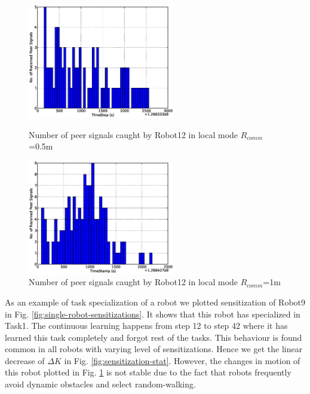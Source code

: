 \documentclass[letterpaper, 10 pt, conference]{ieeeconf}  %
\begin{document}
\begin{figure}
\begin{minipage}[t]{0.5\linewidth}
\centering
\includegraphics[height=5cm, angle=0]{images/local-500cm/Robot12-16feb-1-LocalSignals.eps}
\caption{\small Number of peer signals caught by Robot12 in local mode $R_{comm}$=0.5m}
\label{fig:single-robot-sensitizations} %
\end{minipage} 
\begin{minipage}[t]{0.5\linewidth}
\centering
\includegraphics[height=5cm, angle=0]{images/local-1m/Robot12-17feb-3-LocalSignals.eps}
\caption{\small  Number of peer signals caught by Robot12 in local mode $R_{comm}$=1m}
\label{fig:single-robot-translation} %
\end{minipage}
\end{figure}


As an example of task specialization of a robot we plotted sensitization of Robot9 in Fig. \ref{fig:single-robot-sensitizations}. It shows that this robot has specialized in Task1. The continuous learning happens from step 12 to step 42 where it has learned this task completely and forgot rest of the tasks. This behaviour is found common in all robots with varying level of sensitizations. Hence we get the linear decrease of $\Delta K$ in Fig. \ref{fig:sensitization-stat}. However, the changes in motion of this robot plotted in Fig. \ref{fig:single-robot-translation} is not stable due to the fact that robots frequently avoid dynamic obstacles and select random-walking.
\end{document}
